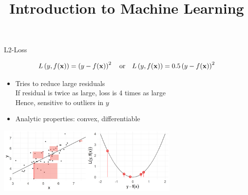 \documentclass[11pt,compress,t,notes=noshow, xcolor=table]{beamer}
\title{Introduction to Machine Learning}
\begin{document}
    

\begin{vbframe}{L2-Loss}

$$
L\left(y, f(\mathbf{x})\right) = \left(y-f(\mathbf{x})\right)^2 \quad \text{or} \quad L\left(y, f(\mathbf{x})\right) = 0.5 \left(y-f(\mathbf{x})\right)^2
$$

\vfill

\begin{itemize}
\item Tries to reduce large residuals \\
If residual is twice as large, loss is 4 times as large\\
Hence, sensitive to outliers in $y$
\item Analytic properties: convex, differentiable 
\end{itemize}






\begin{center}
  \includegraphics[width = 9cm]{figure/loss_quadratic_2.png} \\
\end{center}

\end{vbframe}
\end{document}
